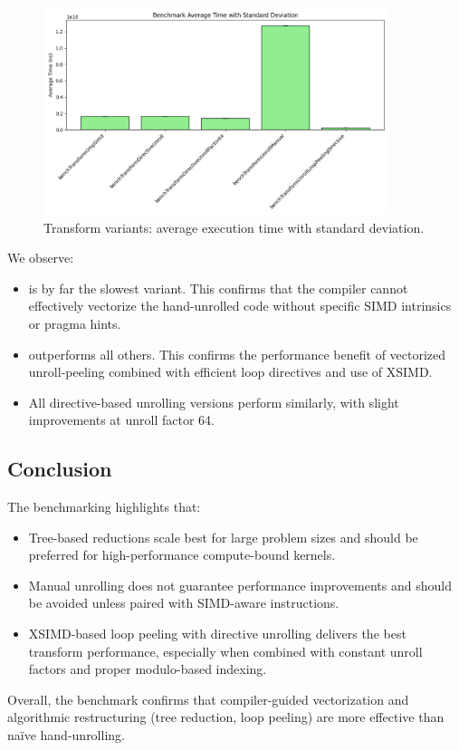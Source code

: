 \begin{figure}[h]
    \centering
    \includegraphics[width=0.9\textwidth]{img/transform_results.csv_ex02.png}
    \caption{Transform variants: average execution time with standard deviation.}
    \label{fig:transform}
\end{figure}

We observe:
\begin{itemize}
    \item {} is by far the slowest variant. This confirms that the compiler cannot effectively vectorize the hand-unrolled code without specific SIMD intrinsics or pragma hints.
    \item {} outperforms all others. This confirms the performance benefit of vectorized unroll-peeling combined with efficient loop directives and use of XSIMD.
    \item All directive-based unrolling versions perform similarly, with slight improvements at unroll factor 64.
\end{itemize}

\subsection*{Conclusion}

The benchmarking highlights that:
\begin{itemize}
    \item Tree-based reductions scale best for large problem sizes and should be preferred for high-performance compute-bound kernels.
    \item Manual unrolling does not guarantee performance improvements and should be avoided unless paired with SIMD-aware instructions.
    \item XSIMD-based loop peeling with directive unrolling delivers the best transform performance, especially when combined with constant unroll factors and proper modulo-based indexing.
\end{itemize}

Overall, the benchmark confirms that compiler-guided vectorization and algorithmic restructuring (tree reduction, loop peeling) are more effective than naïve hand-unrolling.


